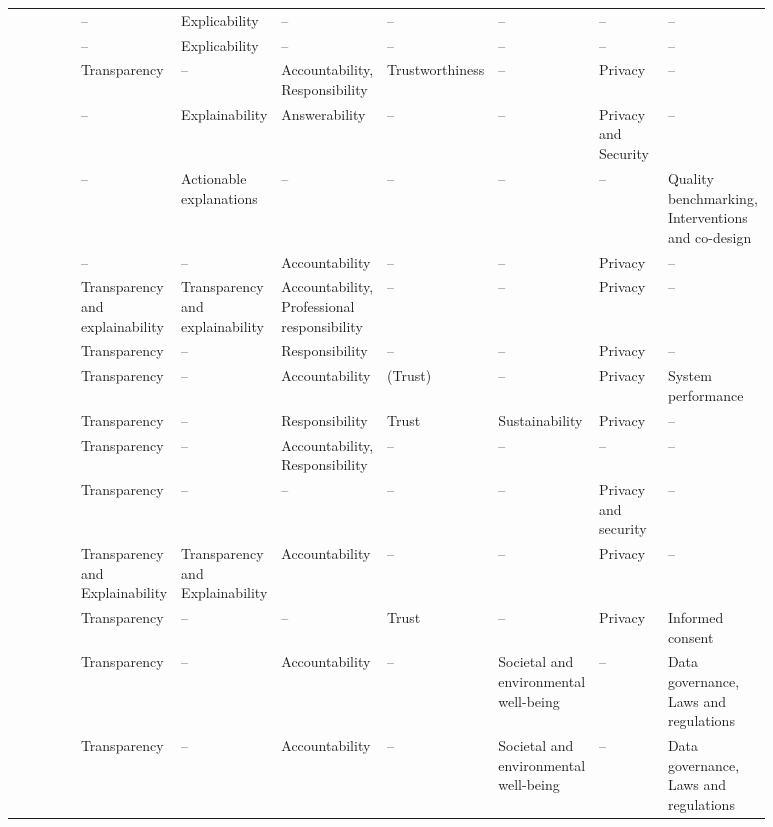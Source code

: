 \begin{landscape}
\begin{ThreePartTable}
\begin{longtable}{P{0.18\linewidth}P{0.1\linewidth}P{0.1\linewidth}P{0.1\linewidth}P{0.1\linewidth}P{0.1\linewidth}P{0.1\linewidth}P{0.1\linewidth}}
        \textcite{Floridi_2018} & -- & Explicability & -- & -- & -- & -- & -- \\ 
        \textcite{Floridi_2019} & -- & Explicability & -- & -- & -- & -- & -- \\ 
        \textcite{Gianni_2022} & Transparency & -- & Accountability, Responsibility & Trustworthiness & -- & Privacy & -- \\ 
        \textcite{Gupta_2021} & -- & Explainability & Answerability & -- & -- & Privacy and \mbox{Security} & -- \\ 
        \textcite{Hacker_2022} & -- & Actionable \mbox{explanations} & -- & -- & -- & -- & Quality benchmarking, \mbox{Interventions} and co-design \\ 
        \textcite{Hagendorff_2020} & -- & -- & Accountability & -- & -- & Privacy & -- \\ 
        \textcite{Havrda_2020} & Transparency and explainability & Transparency and explainability & Accountability, Professional \mbox{responsibility} & -- & -- & Privacy & -- \\ 
        \textcite{Henriksen_2021} & Transparency & -- & Responsibility & -- & -- & Privacy & -- \\ 
        \textcite{Jakesch_2022} & Transparency & -- & Accountability & (Trust)\tnote{*} & -- & Privacy & System \mbox{performance} \\ 
        \textcite{Jobin_2019} & Transparency & -- & Responsibility & Trust & Sustainability & Privacy & -- \\ 
        \textcite{Kumar_2021} & Transparency & -- & Accountability, Responsibility & -- & -- & -- & -- \\ 
        \textcite{Liu_2021} & Transparency & -- & -- & -- & -- & Privacy and \mbox{security} & -- \\ 
        \textcite{Lu_2022} & Transparency and Explainability & Transparency and Explainability & Accountability & -- & -- & Privacy & -- \\ 
        \textcite{Lukkien_2021} & Transparency & -- & -- & Trust & -- & Privacy & Informed consent \\ 
        \textcite{Merhi_2022} & Transparency & -- & Accountability & -- & Societal and \mbox{environmental} well-being & -- & Data \mbox{governance}, Laws and \mbox{regulations} \\ 
        \textcite{Mikalef_2022} & Transparency & -- & Accountability & -- & Societal and \mbox{environmental} well-being & -- & Data \mbox{governance}, Laws and \mbox{regulations} \\ 

\end{longtable}
\end{ThreePartTable}
\end{landscape}
